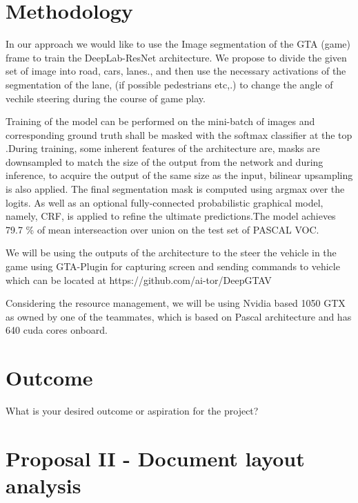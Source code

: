 \documentclass[10pt,twocolumn,letterpaper]{article}
\begin{document}
\section{Methodology}
   In our approach we would like to use the Image segmentation of the GTA (game) frame to train the DeepLab-ResNet architecture. We propose to divide the given set of image into road, cars, lanes., and then use the 
 necessary activations of the segmentation of the lane, (if possible pedestrians etc,.) to change the angle of vechile steering during the course of game play.

Training of the model can be performed on the mini-batch of images and corresponding ground truth shall be masked with the softmax classifier at the top .During training, some inherent features of the architecture are, masks are downsampled to match the size of the output from the network and during inference, to acquire the output of the same size as the input, bilinear upsampling is also applied. The final segmentation mask is computed using argmax over the logits. As well as an optional fully-connected probabilistic graphical model, namely, CRF, is applied to refine the ultimate predictions.The model achieves 79.7 \% of mean interseaction over union on the test set of PASCAL VOC. 

We will be using the outputs of the architecture to the steer the vehicle in the game using GTA-Plugin for capturing screen and sending commands to vehicle which can be located at https://github.com/ai-tor/DeepGTAV

Considering the resource management, we will be using Nvidia based 1050 GTX as owned by one of the teammates, which is based on Pascal architecture and has 640 cuda cores onboard.

\section{Outcome}
    What is your desired outcome or aspiration for the project?

%
%
\section*{Proposal II - Document layout analysis}
\setcounter{section}{0}
\end{document}

